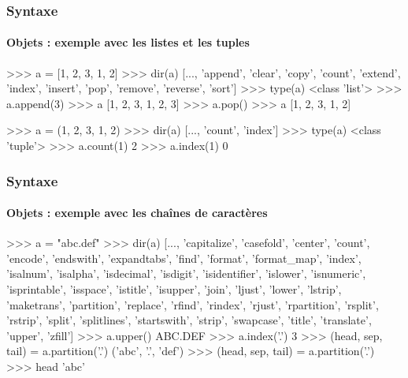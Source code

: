 \begin{frame}[fragile]
\frametitle{Syntaxe}
\framesubtitle{Objets : exemple avec les listes et les tuples}
\begin{pythonConsole}
>>> a = [1, 2, 3, 1, 2]
>>> dir(a)
[..., 'append', 'clear', 'copy', 'count', 'extend', 'index', 'insert', 'pop', 
'remove', 'reverse', 'sort']
>>> type(a)
<class 'list'>
>>> a.append(3)
>>> a 
[1, 2, 3, 1, 2, 3]
>>> a.pop()
>>> a 
[1, 2, 3, 1, 2]
\end{pythonConsole}
\begin{pythonConsole}
>>> a = (1, 2, 3, 1, 2)
>>> dir(a)
[..., 'count', 'index']
>>> type(a)
<class 'tuple'>
>>> a.count(1)
2
>>> a.index(1)
0
\end{pythonConsole}
\end{frame}
\begin{frame}[fragile]
\frametitle{Syntaxe}
\framesubtitle{Objets : exemple avec les chaînes de caractères}
\begin{pythonConsole}
>>> a = "abc.def"
>>> dir(a)
[..., 'capitalize', 'casefold', 'center', 'count', 'encode', 'endswith', 
'expandtabs', 'find', 'format', 'format_map', 'index', 'isalnum', 'isalpha', 
'isdecimal', 'isdigit', 'isidentifier', 'islower', 'isnumeric', 'isprintable',
'isspace', 'istitle', 'isupper', 'join', 'ljust', 'lower', 'lstrip',
'maketrans', 'partition', 'replace', 'rfind', 'rindex', 'rjust', 'rpartition',
'rsplit', 'rstrip', 'split', 'splitlines', 'startswith', 'strip', 'swapcase',
'title', 'translate', 'upper', 'zfill']
>>> a.upper()
ABC.DEF
>>> a.index('.')
3
>>> (head, sep, tail) = a.partition('.')
('abc', '.', 'def')
>>> (head, sep, tail) = a.partition('.')
>>> head
'abc'
\end{pythonConsole}
\end{frame}
